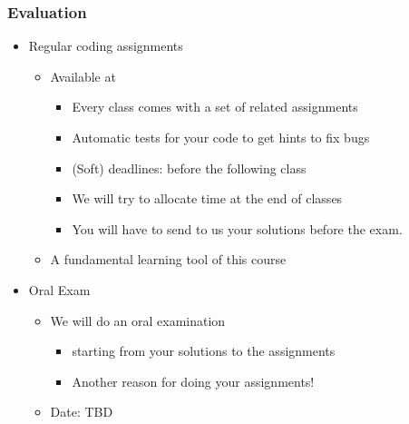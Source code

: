 \documentclass{beamer}%
\begin{document}
\begin{frame}
  \frametitle{Evaluation}

  \begin{itemize}
  \item Regular coding assignments
    \begin{itemize}
    \item Available at \myurl{\homepage}
    \begin{itemize}
	\item Every class comes with a set of related assignments
	\item Automatic tests for your code to get hints to fix bugs
    \item (Soft) deadlines: before the following class
    \item We will try to allocate time at the end of classes
    \item You will have to send to us your solutions before the exam.
	\end{itemize}
	\item {\color{red}A fundamental learning tool of this course}
    \end{itemize}
  \item Oral Exam
    \begin{itemize}
	\item We will do an oral examination
	    \begin{itemize}
	   \item  starting from your solutions to the assignments 	
	   \item {\color{red}Another reason for doing your assignments!}
    	\end{itemize}
    \item Date: TBD
  \end{itemize}
    \end{itemize}
\end{frame}
\end{document}
